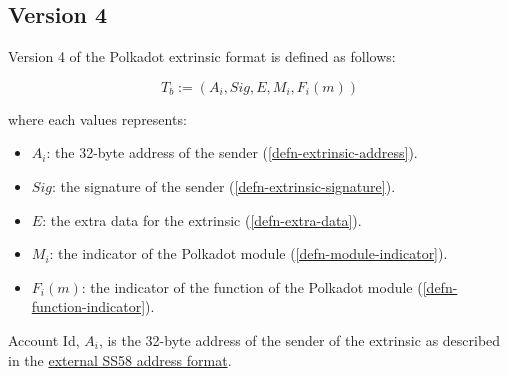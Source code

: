 \subsection{Version 4}

Version 4 of the Polkadot extrinsic format is defined as follows:

\[
    T_b := (A_i, Sig, E, M_i, F_i(m))
\]

where each values represents:
\begin{itemize}
    \item $A_i$: the 32-byte address of the sender (\ref{defn-extrinsic-address}).
    \item $Sig$: the signature of the sender (\ref{defn-extrinsic-signature}).
    \item $E$: the extra data for the extrinsic (\ref{defn-extra-data}).
    \item $M_i$: the indicator of the Polkadot module (\ref{defn-module-indicator}).
    \item $F_i(m)$: the indicator of the function of the Polkadot module (\ref{defn-function-indicator}).
\end{itemize}

\begin{definition}
    \label{defn-extrinsic-address}
    Account Id, $A_i$, is the 32-byte address of the sender of the extrinsic as
    described in the
    \href{https://github.com/paritytech/substrate/wiki/External-Address-Format-(SS58)}{external
    SS58 address format}.
\end{definition}

